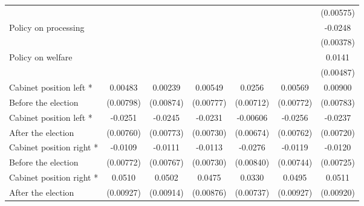 \begin{table}[!ht]
\begin{tabular}{l*{6}{c}}
                    &                     &                     &                     &                     &                     &   (0.00575)         \\
[0.5em]
Policy on processing&                     &                     &                     &                     &                     &     -0.0248\sym{***}\\
                    &                     &                     &                     &                     &                     &   (0.00378)         \\
[0.5em]
Policy on welfare   &                     &                     &                     &                     &                     &      0.0141\sym{**} \\
                    &                     &                     &                     &                     &                     &   (0.00487)         \\
[0.5em]
Cabinet position left * &     0.00483         &     0.00239         &     0.00549         &      0.0256\sym{***}&     0.00569         &     0.00900         \\
Before the election                    &   (0.00798)         &   (0.00874)         &   (0.00777)         &   (0.00712)         &   (0.00772)         &   (0.00783)         \\
[0.5em]
Cabinet position left * &     -0.0251\sym{**} &     -0.0245\sym{**} &     -0.0231\sym{**} &    -0.00606         &     -0.0256\sym{**} &     -0.0237\sym{**} \\
 After the election                   &   (0.00760)         &   (0.00773)         &   (0.00730)         &   (0.00674)         &   (0.00762)         &   (0.00720)         \\
[0.5em]
Cabinet position right * &     -0.0109         &     -0.0111         &     -0.0113         &     -0.0276\sym{**} &     -0.0119         &     -0.0120         \\
 Before the election                   &   (0.00772)         &   (0.00767)         &   (0.00730)         &   (0.00840)         &   (0.00744)         &   (0.00725)         \\
[0.5em]
Cabinet position right * &      0.0510\sym{***}&      0.0502\sym{***}&      0.0475\sym{***}&      0.0330\sym{***}&      0.0495\sym{***}&      0.0511\sym{***}\\
 After the election                   &   (0.00927)         &   (0.00914)         &   (0.00876)         &   (0.00737)         &   (0.00927)         &   (0.00920)         \\

\end{tabular}
\end{table}
